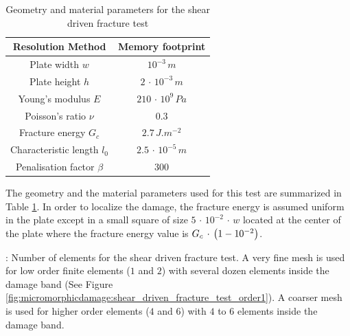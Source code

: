 \begin{table}[H]
    \centering
    \begin{tabular}{||c c||} 
        \hline
        Resolution Method & Memory footprint
        \\
        [0.5ex] 
        \hline\hline
        Plate width \(w\)                & \(10^{-3}\, m\)             
        \\ \hline
        Plate height \(h\)               & \(2\,\cdot\,10^{-3}\, m\)   
        \\ \hline
        Young's modulus \(E\)            & \(210\,\cdot\,10^{9}\, Pa\) 
        \\ \hline
        Poisson's ratio \(\nu\)          & \(0.3\)                     
        \\ \hline
        Fracture energy \(G_{c}\)        & \(2.7\,J.m^{-2}\)           
        \\ \hline
        Characteristic length  \(l_{0}\) & \(2.5\,\cdot\,10^{-5}\,m\)  
        \\ \hline
        Penalisation factor \(\beta\)    & \(300\)                     
        \\ \hline
    \end{tabular}
    \caption{Geometry and material parameters for the shear driven fracture test}
    \label{tbl:micromorphicdamage:shear_driven_fracture_test_parameters}
\end{table}


The geometry and the material parameters used for this test are
summarized in Table
\ref{tbl:micromorphicdamage:shear_driven_fracture_test_parameters}. In order
to localize the damage, the fracture energy is assumed uniform in the
plate except in a small square of size \(5\,\cdot\,10^{-2}\,\cdot\,w\)
located at the center of the plate where the fracture energy value is
\(G_{c}\,\cdot\,\left(1-10^{-2}\right)\).

: Number of elements for the shear driven fracture test. A very fine
mesh is used for low order finite elements (\(1\) and \(2\)) with
several dozen elements inside the damage band (See Figure
\ref{fig:micromorphicdamage:shear_driven_fracture_test_order1}). A coarser
mesh is used for higher order elements (\(4\) and \(6\)) with \(4\) to
\(6\) elements inside the damage band.



